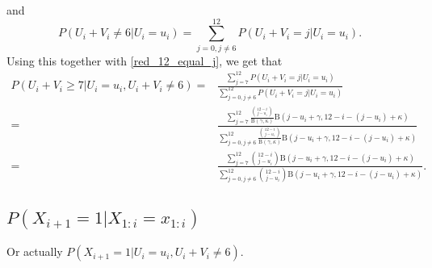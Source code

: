 \documentclass{article}
\begin{document}
and
\begin{equation*}
    P(U_i+V_i \neq 6|U_i=u_i) = \sum_{j=0,j\neq6}^{12} P(U_i+V_i=j|U_i=u_i).
\end{equation*}
Using this together with \eqref{red_12_equal_j}, we get that
\begin{equation*}
    \begin{aligned}
        P(U_i+V_i \geq 7 | U_i=u_i, U_i+V_i \neq 6)
        =&\frac{\sum_{j=7}^{12} P(U_i+V_i=j|U_i=u_i)}{\sum_{j=0,j\neq6}^{12} P(U_i+V_i=j|U_i=u_i)} \\[6pt]
        =&\frac{\sum_{j=7}^{12}  \frac{\binom{12-i}{j-u_i}}{\text{B}(\gamma,\kappa)} \text{B}(j-u_i+\gamma,12-i-(j-u_i)+\kappa) }{\sum_{j=0,j\neq6}^{12} \frac{\binom{12-i}{j-u_i}}{\text{B}(\gamma,\kappa)}\text{B}(j-u_i+\gamma,12-i-(j-u_i)+\kappa)}\\[6pt]
        =&\frac{\sum_{j=7}^{12}\binom{12-i}{j-u_i} \text{B}(j-u_i+\gamma,12-i-(j-u_i)+\kappa) }{\sum_{j=0,j\neq6}^{12} \binom{12-i}{j-u_i}\text{B}(j-u_i+\gamma,12-i-(j-u_i)+\kappa)}.
    \end{aligned}
\end{equation*}


\subsection{$P(X_{i+1}=1|X_{1:i}=x_{1:i})$}
Or actually $P(X_{i+1}=1|U_i=u_i,U_i+V_i \neq 6)$.
\end{document}

